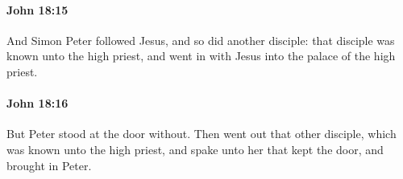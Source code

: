 		\paragraph{John 18:15} %
			\label{JOHN-18-15}

			And Simon Peter followed Jesus, and so did another disciple: that disciple was known unto the high priest, and went in with Jesus into the palace of the high priest.

			\begin{framed}
				\scriptsize
				\begin{compactdesc}
					\item[SBLG] 
				\end{compactdesc}
			\end{framed}

		\paragraph{John 18:16} %
			\label{JOHN-18-16}

			But Peter stood at the door without. Then went out that other disciple, which was known unto the high priest, and spake unto her that kept the door, and brought in Peter.

